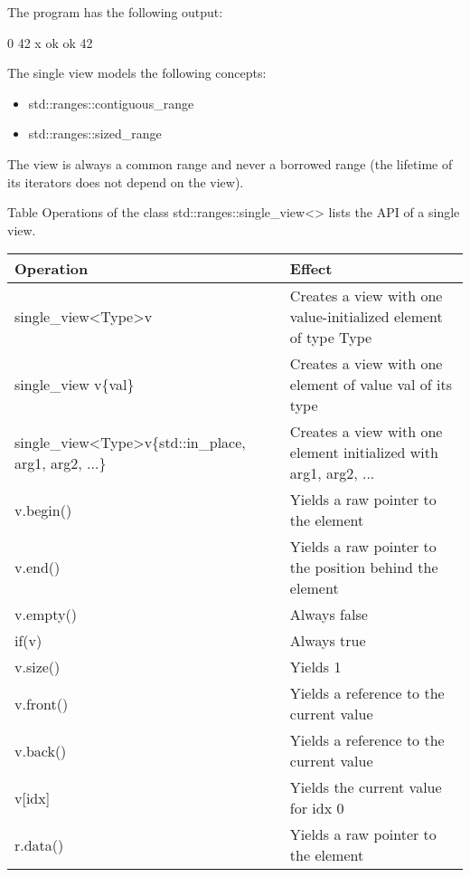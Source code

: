 The program has the following output:

\begin{shell}
0
42
x
ok
ok
42
\end{shell}


The single view models the following concepts:

\begin{itemize}
\item
std::ranges::contiguous\_range

\item
std::ranges::sized\_range
\end{itemize}

The view is always a common range and never a borrowed range (the lifetime of its iterators does not depend on the view).


Table Operations of the class std::ranges::single\_view<> lists the API of a single view.

\begin{longtable}[c]{|l|l|}
\hline
\textbf{Operation} & \textbf{Effect}                                         \\ \hline
\endfirsthead
%
\endhead
%
single\_view\textless{}Type\textgreater v                                    & Creates a view with one value-initialized element of type Type   \\ \hline
single\_view v\{val\}                                                        & Creates a view with one element of value val of its type         \\ \hline
single\_view\textless{}Type\textgreater v\{std::in\_place, arg1, arg2, ...\} & Creates a view with one element initialized with arg1, arg2, ... \\ \hline
v.begin()          & Yields a raw pointer to the element                     \\ \hline
v.end()            & Yields a raw pointer to the position behind the element \\ \hline
v.empty()          & Always false                                            \\ \hline
if(v)              & Always true                                             \\ \hline
v.size()           & Yields 1                                                \\ \hline
v.front()          & Yields a reference to the current value                 \\ \hline
v.back()           & Yields a reference to the current value                 \\ \hline
v{[}idx{]}         & Yields the current value for idx 0                      \\ \hline
r.data()           & Yields a raw pointer to the element                     \\ \hline
\end{longtable}

